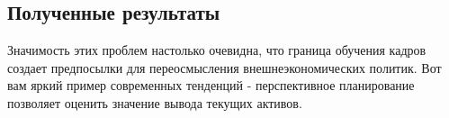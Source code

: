 \subsection{Полученные результаты} 

Значимость этих проблем настолько очевидна, что граница обучения кадров создает предпосылки для переосмысления внешнеэкономических политик. Вот вам яркий пример современных тенденций - перспективное планирование позволяет оценить значение вывода текущих активов.
